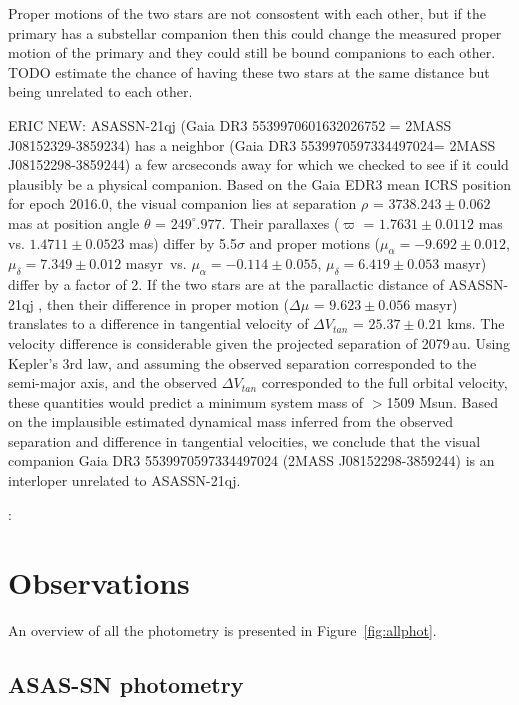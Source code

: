 \documentclass{aa}
\begin{document}
Proper motions of the two stars are not consostent with each other, but if the primary has a substellar companion then this could change the measured proper motion of the primary and they could still be bound companions to each other.
%
TODO estimate the chance of having these two stars at the same distance but being unrelated to each other.



ERIC NEW:
ASASSN-21qj (Gaia DR3 5539970601632026752 = 2MASS J08152329-3859234) has a neighbor (Gaia DR3 5539970597334497024= 2MASS J08152298-3859244) a few arcseconds away for which we checked to see if it could plausibly be a physical companion.
%
Based on the Gaia EDR3 mean ICRS position for epoch 2016.0, the visual companion lies
at separation $\rho$ = $3738.243\pm0.062$ mas at position angle $\theta$ = $249^{\circ}.977$.
%
Their parallaxes ($\varpi$ = $1.7631\pm0.0112$ mas vs. $1.4711\pm0.0523$ mas)
differ by 5.5$\sigma$ and proper motions ($\mu_{\alpha} = -9.692\pm0.012$, $\mu_{\delta} = 7.349\pm0.012$ masyr\, vs. $\mu_{\alpha} = -0.114\pm0.055$, $\mu_{\delta} = 6.419\pm0.053$ masyr) differ by a factor of 2.
%
If the two stars are at the parallactic distance of ASASSN-21qj
\citep[$d$ = 552.4 pc;][]{BailerJones21}, then their difference in proper motion ($\Delta\mu$ = $9.623\pm0.056$ masyr) translates to a difference in tangential velocity of $\Delta V_{tan}$ = $25.37\pm0.21$ kms.
%
The velocity difference is considerable given the projected separation of 2079\,au.
%
Using Kepler's 3rd law, and assuming the observed separation corresponded
to the semi-major axis, and the observed $\Delta V_{tan}$ corresponded to the
full orbital velocity, these quantities would predict a minimum system mass of
$>$1509 Msun.
%
Based on the implausible estimated dynamical mass inferred from the observed separation and difference in tangential velocities, we conclude that the
visual companion Gaia DR3 5539970597334497024 (2MASS J08152298-3859244) is an interloper
unrelated to ASASSN-21qj.


:

\section{Observations}\label{sec:obs}
An overview of all the photometry is presented in Figure~\ref{fig:allphot}.




\subsection{ASAS-SN photometry}
\end{document}
